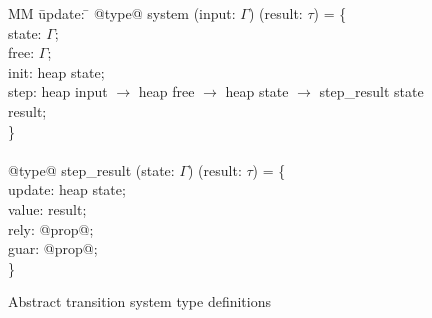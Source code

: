 
\begin{figure}
  \begin{tabbing}
  MM \= update: \= \kill
  @type@ system (input: $\Gamma$) (result: $\tau$) = \{ \\
  \> state:  \> $\Gamma$; \\
  \> free: \> $\Gamma$; \\
  \> init: \> heap state; \\
  \> step: \> heap input $\to$ heap free $\to$ heap state $\to$ step_result state result; \\
  \} \\
  \\
  @type@ step_result (state: $\Gamma$) (result: $\tau$) = \{ \\
  \> update:  \> heap state; \\
  \> value: \> result; \\
  \> rely: \> @prop@; \\
  \> guar: \> @prop@; \\
  \} \\
  \end{tabbing}
  \caption{Abstract transition system type definitions}
  \label{f:system-types}
\end{figure}